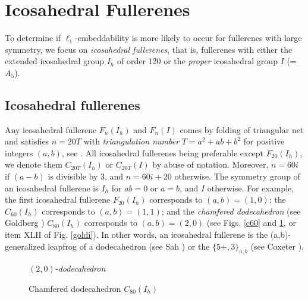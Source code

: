 \clearpage
\section{Icosahedral Fullerenes}
To determine if $\ell_1$-embeddability is more likely to occur for fullerenes with 
large symmetry, we focus on {\em icosahedral fullerenes}, that is,
fullerenes with either the extended icosahedral group 
$I_h$ of order 120 or the {\it proper} icosahedral group $I$ (=$A_5$). %

\subsection{Icosahedral fullerenes}\label{tria}
Any icosahedral fullerene $F_n(I_h)$ and $F_n(I)$ comes by folding of
triangular net and satisfies $n=20T$ with {\it triangulation number}
$T=a^2+ab+b^2$ for positive integers
$(a,b)$, see \cite{c71,g37}. All icosahedral fullerenes being preferable except
$F_{20}(I_h)$, we denote them $C_{20T}(I_h)$ or $C_{20T}(I)$ by abuse of notation.
Moreover, $n=60i$ if $(a-b)$ is divisible by $3$, and $n=60i+20$
otherwise. The symmetry group of an icosahedral fullerene is $I_h$ for $ab=0$ or $a=b$, 
and $I$ otherwise. For example, the first icosahedral fullerene $F_{20}(I_h)$
corresponds to $(a,b)=(1,0)$; the $C_{60}(I_h)$ corresponds
to $(a,b)=(1,1)$; and the {\em chamfered dodecahedron} (see {\sc Goldberg} 
\cite{g35}) $C_{80}(I_h)$ corresponds to $(a,b)=(2,0)$ (see Figs. \ref{c60} 
and \ref{c80}, or item XLII of Fig. \ref{goldi}). 
In other words, an icosahedral fullerene is the (a,b)-generalized 
leapfrog of a dodecahedron (see {\sc Sah} \cite{s94}) or the $\{5+,3\}_{a,b}$
(see {\sc Coxeter} \cite{c71}). 

\begin{figure}[hb]
\begin{center}
\caption{The $C_{60}(I_h)$ or $(1,1)$-dodecahedron}\label{c60}
\end{center}
\begin{center}
\caption{Chamfered dodecahedron $C_{80}(I_h)$}\label{c80}
{\it $(2,0)$-dodecahedron}
\end{center}
\end{figure}

